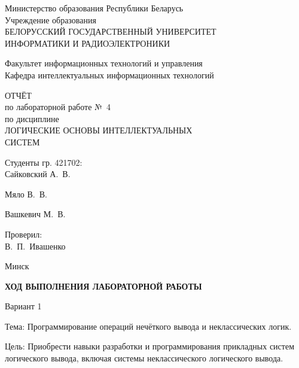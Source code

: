 \documentclass[14pt,a4paper]{extarticle}
\newcommand{\studentgroup}{421702}
\newcommand{\studentone}{Сайковский А.~В.}
\newcommand{\studenttwo}{Мяло В.~В.}
\newcommand{\studentthree}{Вашкевич М.~В.}
\newcommand{\teachername}{В.~П.~Ивашенко}
\begin{document}

\begin{titlepage}
\thispagestyle{empty}
\begin{center}
Министерство образования Республики Беларусь\\[2mm]
Учреждение образования\\
БЕЛОРУССКИЙ ГОСУДАРСТВЕННЫЙ УНИВЕРСИТЕТ\\
ИНФОРМАТИКИ И РАДИОЭЛЕКТРОНИКИ
\end{center}
\vspace{2.8cm}
\noindent Факультет информационных технологий и управления\\
\noindent Кафедра интеллектуальных информационных технологий
\vfill
\begin{center}
ОТЧЁТ\\[2mm]
по лабораторной работе №~4\\
по дисциплине\\[2mm]
ЛОГИЧЕСКИЕ ОСНОВЫ ИНТЕЛЛЕКТУАЛЬНЫХ\\
СИСТЕМ
\end{center}
\vfill
\noindent
\begin{minipage}[t]{0.57\textwidth}
Студенты гр. \studentgroup:\\[3mm]
\studentone

\studenttwo

\studentthree
\end{minipage}
\hfill
\begin{minipage}[t]{0.40\textwidth}
\raggedleft
Проверил:\\[3mm]
\teachername
\end{minipage}
\vfill
\begin{center}
Минск \the\year
\end{center}
\end{titlepage}

\setcounter{page}{2}
\begin{center}
\textbf{ХОД ВЫПОЛНЕНИЯ ЛАБОРАТОРНОЙ РАБОТЫ}
\end{center}
\begin{center}
Вариант 1
\end{center}

\noindent Тема: Программирование операций нечёткого вывода и неклассических логик.

\noindent Цель: Приобрести навыки разработки и программирования прикладных систем логического вывода, включая системы неклассического логического вывода.
\end{document}
